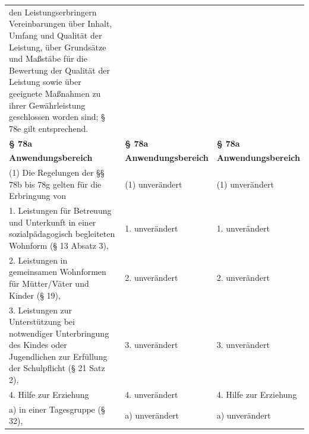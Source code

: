 \documentclass[10pt,a4paper,landscape]{article}
\begin{document}
\begin{longtable}{|L{8.2cm}|L{8.2cm}|L{8.2cm}|}
den  \newline Leistungserbringern Vereinbarungen über  \newline Inhalt, Umfang und Qualität der Leistung,  \newline über Grundsätze und Maßstäbe für die  \newline Bewertung der Qualität der Leistung sowie  \newline über geeignete Maßnahmen zu ihrer  \newline Gewährleistung geschlossen worden sind;  \newline \S{} 78e gilt entsprechend. \\
\hhline{|---|}
\textbf{\S{} 78a} & \textbf{\S{} 78a} & \textbf{\S{} 78a} \\
\hhline{|---|}
\textbf{Anwendungsbereich} & \textbf{Anwendungsbereich} & \textbf{Anwendungsbereich} \\
\hhline{|---|}
(1) Die Regelungen der \S{}\S{} 78b bis 78g  \newline gelten für die Erbringung von & (1) unverändert & (1) unverändert \\
\hhline{|---|}
1.  \newline Leistungen für Betreuung und Unterkunft in  \newline einer sozialpädagogisch begleiteten  \newline Wohnform (\S{} 13 Absatz 3), & 1. unverändert & 1. unverändert \\
\hhline{|---|}
2.  \newline Leistungen in gemeinsamen Wohnformen  \newline für Mütter/Väter und Kinder (\S{} 19), & 2. unverändert & 2. unverändert \\
\hhline{|---|}
3.  \newline Leistungen zur Unterstützung bei  \newline notwendiger Unterbringung des Kindes  \newline oder Jugendlichen zur Erfüllung der  \newline Schulpflicht (\S{} 21 Satz 2), & 3. unverändert & 3. unverändert \\
\hhline{|---|}
4.  \newline Hilfe zur Erziehung & 4. unverändert & 4.   \newline Hilfe zur Erziehung \\
\hhline{|---|}
a)  \newline in einer Tagesgruppe (\S{} 32), & a) unverändert & a) unverändert \\

\end{longtable}
\end{document}
